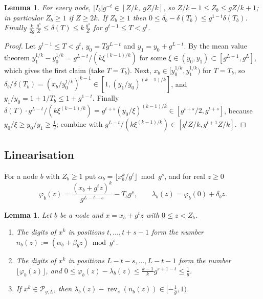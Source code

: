 \documentclass[11pt]{amsart}
\newtheorem{lemma}[theorem]{Lemma}
\theoremstyle{definition}
\numberwithin{equation}{section}
\newcommand{\cP}{\mathcal{P}}
\newcommand{\rev}{\operatorname{rev}}
\begin{document}
\begin{lemma}\label{lem:sizes}
For every node, $|I_b|g^{-t}\in[Z/k,\ gZ/k]$, so $Z/k-1\le Z_b\le gZ/k+1$;
in particular $Z_b\ge1$ if $Z\ge2k$. If $Z_b\ge1$ then
$0\le\delta_b-\delta(T_b)\le g^{1-t}\delta(T_b)$. Finally
$\frac{k}{2g}\,\frac{g^s}Z\le\delta(T)\le k\,\frac{g^s}Z$ for
$g^{t-1}\le T<g^t$.
\end{lemma}

\begin{proof}
Let $g^{t-1}\le T<g^t$, $y_0=Tg^{L-t}$ and $y_1=y_0+g^{L-t}$. By the mean value
theorem $y_1^{1/k}-y_0^{1/k}=g^{L-t}/(k\xi^{(k-1)/k})$ for some
$\xi\in(y_0,y_1)\subset[g^{L-1},g^L]$, which gives the first claim (take
$T=T_b$). Next, $x_b\in[y_0^{1/k},y_1^{1/k})$ for $T=T_b$, so
$\delta_b/\delta(T_b)=(x_b/y_0^{1/k})^{k-1}\in[1,(y_1/y_0)^{(k-1)/k}]$, and
$y_1/y_0=1+1/T_b\le1+g^{1-t}$. Finally
$\delta(T)\cdot g^{L-t}/(k\xi^{(k-1)/k})=g^{t+s}(y_0/\xi)^{(k-1)/k}\in[g^{t+s}/2,g^{t+s}]$,
because $y_0/\xi\ge y_0/y_1\ge\frac12$; combine with
$g^{L-t}/(k\xi^{(k-1)/k})\in[g^tZ/k,g^{t+1}Z/k]$.
\end{proof}

\subsection{Linearisation}
For a node $b$ with $Z_b\ge1$ put
$\alpha_b=\lfloor x_b^k/g^t\rfloor\bmod g^s$, and for real $z\ge0$
\[
\varphi_b(z)=\frac{(x_b+g^tz)^k}{g^{L-t-s}}-T_bg^s,\qquad
\lambda_b(z)=\varphi_b(0)+\delta_bz .
\]

\begin{lemma}\label{lem:lin}
Let $b$ be a node and $x=x_b+g^tz$ with $0\le z<Z_b$.
\begin{enumerate}[label=\textup{(\alph*)}]
\item The digits of $x^k$ in positions $t,\dots,t+s-1$ form the number
$n_b(z):=(\alpha_b+\beta_bz)\bmod g^s$.
\item The digits of $x^k$ in positions $L-t-s,\dots,L-t-1$ form the number
$\lfloor\varphi_b(z)\rfloor$, and
$0\le\varphi_b(z)-\lambda_b(z)\le\frac{k-1}kg^{s+1-t}\le\frac1g$.
\item If $x^k\in\cP_{g,L}$, then
$\lambda_b(z)-\rev_s(n_b(z))\in[-\frac1g,1)$.
\end{enumerate}
\end{lemma}
\end{document}

